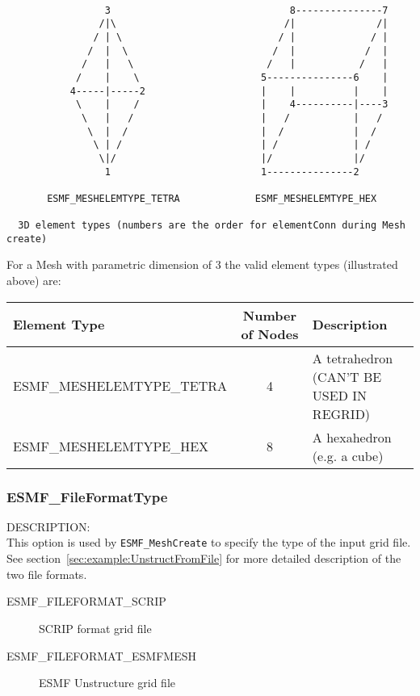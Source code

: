 \begin{verbatim}
                                            
                 3                               8---------------7
                /|\                             /|              /|
               / | \                           / |             / |
              /  |  \                         /  |            /  |
             /   |   \                       /   |           /   |
            /    |    \                     5---------------6    |
           4-----|-----2                    |    |          |    |
            \    |    /                     |    4----------|----3
             \   |   /                      |   /           |   /
              \  |  /                       |  /            |  /
               \ | /                        | /             | /
                \|/                         |/              |/
                 1                          1---------------2

       ESMF_MESHELEMTYPE_TETRA             ESMF_MESHELEMTYPE_HEX  

  3D element types (numbers are the order for elementConn during Mesh create)

\end{verbatim}

For a Mesh with parametric dimension of 3 the valid element types (illustrated above) are:

\smallskip

\begin{tabular}{|l|c|l|}
\hline
Element Type & Number of Nodes & Description \\
\hline
ESMF\_MESHELEMTYPE\_TETRA & 4 & A tetrahedron (CAN'T BE USED IN REGRID) \\
ESMF\_MESHELEMTYPE\_HEX  & 8 & A hexahedron (e.g. a cube) \\
\hline
\end{tabular}

\subsubsection{ESMF\_FileFormatType}
\label{sec:opt:fileformat}
{\sf DESCRIPTION:\\}
This option is used by {\tt ESMF\_MeshCreate} to specify the type of the input grid file.  See 
section~\ref{sec:example:UnstructFromFile} for more detailed description of the two file formats.

\medskip
\begin{description}
\item [ESMF\_FILEFORMAT\_SCRIP] SCRIP format grid file

\item [ESMF\_FILEFORMAT\_ESMFMESH] ESMF Unstructure grid file
\end{description}


